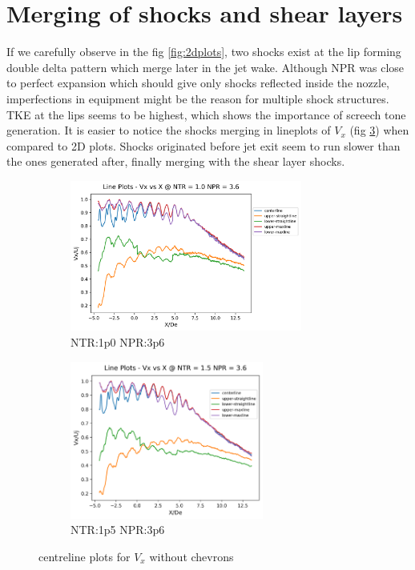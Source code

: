 \section{Merging of shocks and shear layers}
If we carefully observe in the fig \ref{fig:2dplots}, two shocks exist at the lip forming double delta pattern which merge later in the jet wake. Although NPR was close to perfect expansion which should give only shocks reflected inside the nozzle, imperfections in equipment might be the reason for multiple shock structures. TKE at the lips seems to be highest, which shows the importance of screech tone generation. It is easier to notice the shocks merging in lineplots of $V_x$ (fig \ref{fig:lineplotsVx}) when compared to 2D plots. Shocks originated before jet exit seem to run slower than the ones generated after, finally merging with the shear layer shocks.\\ 
 
\begin{figure}[H]
\begin{subfigure}{.5\textwidth}
	\centering
	\includegraphics[width=3in]{images/LinePlots_Vx_NTR1p0_NPR3p6.png}
	\caption{NTR:1p0 NPR:3p6 }
	\label{fig:setup1}
\end{subfigure}%
\begin{subfigure}{.5\textwidth}
	\centering
	\includegraphics[width=2.5in]{images/LinePlots_Vx_NTR1p5_NPR3p6.png}
	\caption{NTR:1p5 NPR:3p6 }
	\label{fig:setup2}
\end{subfigure}
\caption{centreline plots for $V_x$ without chevrons }
\label{fig:lineplotsVx}
\end{figure} 

